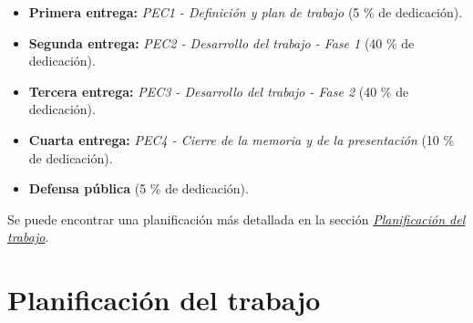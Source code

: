 \documentclass[IB,BIB]{TFUOC}%
\begin{document}
\begin{itemize}
    \item \textbf{Primera entrega:} \textit{PEC1 - Definición y plan de trabajo} (5 \% de dedicación).
    \item \textbf{Segunda entrega:} \textit{PEC2 - Desarrollo del trabajo - Fase 1} (40 \% de dedicación).
    \item \textbf{Tercera entrega:} \textit{PEC3 - Desarrollo del trabajo - Fase 2} (40 \% de dedicación).
    \item \textbf{Cuarta entrega:} \textit{PEC4 - Cierre de la memoria y de la presentación} (10 \% de dedicación).
    \item \textbf{Defensa pública} (5 \% de dedicación).
\end{itemize}

Se puede encontrar una planificación más detallada en la sección \textit{\hyperref[sec:Planificación del trabajo]{Planificación del trabajo}}.


\newpage

\section{Planificación del trabajo}
\label{sec:Planificación del trabajo}


\end{document}
